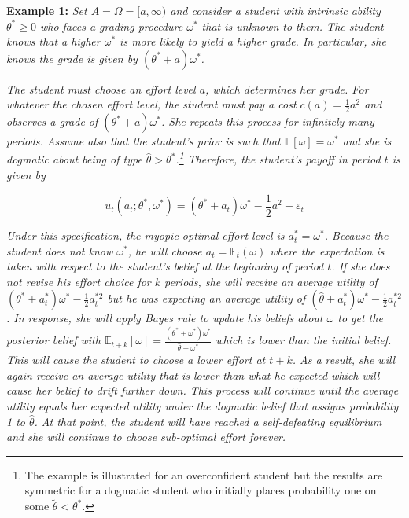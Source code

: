 \documentclass[
  12pt,
]{article}
\begin{document}
\textbf{Example 1: } \emph{Set \(A = \Omega=[\underline{a}, \infty)\)
and consider a student with intrinsic ability \(\theta^*\geq 0\) who
faces a grading procedure \(\omega^*\) that is unknown to them. The
student knows that a higher \(\omega^*\) is more likely to yield a
higher grade. In particular, she knows the grade is given by
\((\theta^*+a)\omega^*\).}

\emph{The student must choose an effort level \(a\), which determines
her grade. For whatever the chosen effort level, the student must pay a
cost \(c(a) = \frac{1}{2}a^2\) and observes a grade of
\((\theta^*+a)\omega^*\). She repeats this process for infinitely many
periods. Assume also that the student's prior is such that
\(\mathbb{E}[\omega]= \omega^*\) and she is dogmatic about being of type
\(\hat{\theta}>\theta^*\).\footnote{The example is illustrated for an overconfident student but 
the results are symmetric for a dogmatic student who initially 
places probability one on some $\tilde{\theta}<\theta^*$.} Therefore,
the student's payoff in period \(t\) is given by }

\begin{equation}
u_t(a_t; \theta^*, \omega^*) = (\theta^*+a_t)\omega^* - \frac{1}{2}a^2 + \varepsilon_t
\end{equation}

\emph{Under this specification, the myopic optimal effort level is
\(a_t^* = \omega^*\). Because the student does not know \(\omega^*\), he
will choose \(a_t = \mathbb{E}_t(\omega)\) where the expectation is
taken with respect to the student's belief at the beginning of period
\(t\). If she does not revise his effort choice for \(k\) periods, she
will receive an average utility of
\((\theta^*+a_t^*)\omega^* - \frac{1}{2}a_t^{*2}\) but he was expecting
an average utility of
\((\hat{\theta}+a_t^*)\omega^* - \frac{1}{2}a_t^{*2}\). In response, she
will apply Bayes rule to update his beliefs about \(\omega\) to get the
posterior belief with
\(\mathbb{E}_{t+k}[\omega] = \frac{(\theta^{*} + \omega^{*})\omega^{*}}{\hat{\theta} + \omega^{*}}\)
which is lower than the initial belief. This will cause the student to
choose a lower effort at \(t+k\). As a result, she will again receive an
average utility that is lower than what he expected which will cause her
belief to drift further down. This process will continue until the
average utility equals her expected utility under the dogmatic belief
that assigns probability 1 to \(\hat{\theta}\). At that point, the
student will have reached a self-defeating equilibrium and she will
continue to choose sub-optimal effort forever. }
\end{document}
